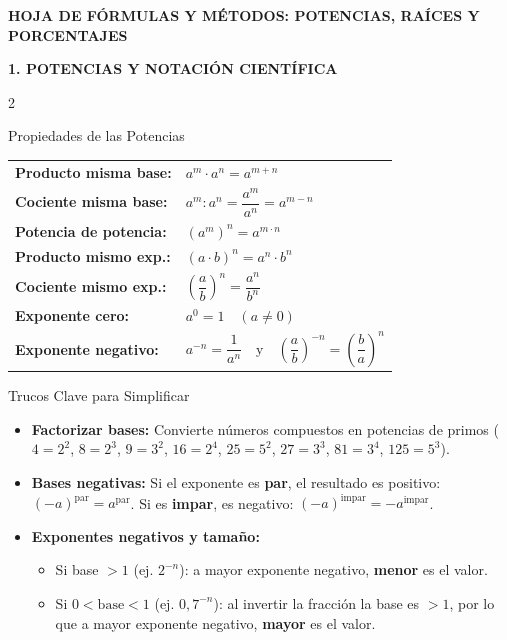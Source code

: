 \documentclass[a4paper,11pt]{article}
\begin{document}
\begin{center}
    \Large\textbf{\color{primary} HOJA DE FÓRMULAS Y MÉTODOS: POTENCIAS, RAÍCES Y PORCENTAJES}
\end{center}

\vspace{0.1cm}

\noindent\textbf{\large\color{primary} 1. POTENCIAS Y NOTACIÓN CIENTÍFICA}
\vspace{0.1cm}

\begin{multicols}{2}

\begin{formulabox}{Propiedades de las Potencias}
\renewcommand{\arraystretch}{1.35}
\begin{tabular}{@{}ll@{}}
\textbf{Producto misma base:} & $a^{m} \cdot a^{n} = a^{m+n}$ \\
\textbf{Cociente misma base:} & $a^{m} : a^{n} = \dfrac{a^{m}}{a^{n}} = a^{m-n}$ \\
\textbf{Potencia de potencia:} & $(a^{m})^{n} = a^{m \cdot n}$ \\
\textbf{Producto mismo exp.:} & $(a \cdot b)^{n} = a^{n} \cdot b^{n}$ \\
\textbf{Cociente mismo exp.:} & $\left(\dfrac{a}{b}\right)^{n} = \dfrac{a^{n}}{b^{n}}$ \\
\textbf{Exponente cero:} & $a^{0} = 1 \quad (a \neq 0)$ \\
\textbf{Exponente negativo:} & $a^{-n} = \dfrac{1}{a^{n}} \quad \text{y} \quad \left(\dfrac{a}{b}\right)^{-n} = \left(\dfrac{b}{a}\right)^{n}$
\end{tabular}
\end{formulabox}

\columnbreak

\begin{formulabox}{Trucos Clave para Simplificar}
\begin{itemize}[leftmargin=*, itemsep=2pt, topsep=0pt]
    \item \textbf{Factorizar bases:} Convierte números compuestos en potencias de primos ($4=2^2$, $8=2^3$, $9=3^2$, $16=2^4$, $25=5^2$, $27=3^3$, $81=3^4$, $125=5^3$).
    \item \textbf{Bases negativas:} Si el exponente es \textbf{par}, el resultado es positivo: $(-a)^{\text{par}} = a^{\text{par}}$. Si es \textbf{impar}, es negativo: $(-a)^{\text{impar}} = -a^{\text{impar}}$.
    \item \textbf{Exponentes negativos y tamaño:}
    \begin{itemize}[leftmargin=12pt]
        \item Si base $> 1$ (ej. $2^{-n}$): a mayor exponente negativo, \textbf{menor} es el valor.
        \item Si $0 < \text{base} < 1$ (ej. $0,7^{-n}$): al invertir la fracción la base es $>1$, por lo que a mayor exponente negativo, \textbf{mayor} es el valor.
    \end{itemize}
\end{itemize}
\end{formulabox}


\end{multicols}
\end{document}
